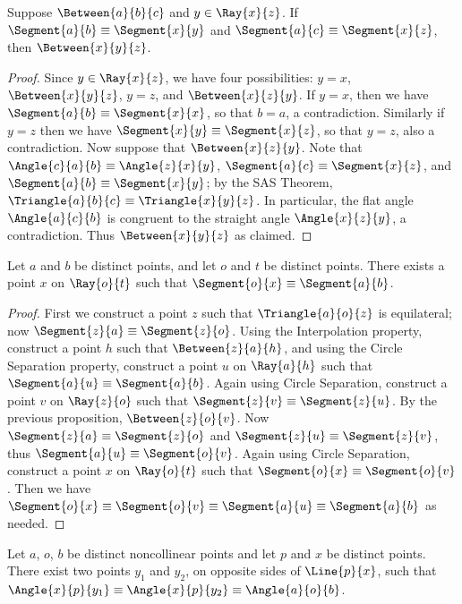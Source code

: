 \documentclass{article}
\begin{document}
\begin{lem}
Suppose $\Between{a}{b}{c}$ and $y \in \Ray{x}{z}$. If $\Segment{a}{b} \equiv \Segment{x}{y}$ and $\Segment{a}{c} \equiv \Segment{x}{z}$, then $\Between{x}{y}{z}$.
\end{lem}

\begin{proof}
Since $y \in \Ray{x}{z}$, we have four possibilities: $y = x$, $\Between{x}{y}{z}$, $y = z$, and $\Between{x}{z}{y}$. If $y = x$, then we have $\Segment{a}{b} \equiv \Segment{x}{x}$, so that $b = a$, a contradiction. Similarly if $y = z$ then we have $\Segment{x}{y} \equiv \Segment{x}{z}$, so that $y = z$, also a contradiction. Now suppose that $\Between{x}{z}{y}$. Note that $\Angle{c}{a}{b} \equiv \Angle{z}{x}{y}$, $\Segment{a}{c} \equiv \Segment{x}{z}$, and $\Segment{a}{b} \equiv \Segment{x}{y}$; by the SAS Theorem, $\Triangle{a}{b}{c} \equiv \Triangle{x}{y}{z}$. In particular, the flat angle $\Angle{a}{c}{b}$ is congruent to the straight angle $\Angle{x}{z}{y}$, a contradiction. Thus $\Between{x}{y}{z}$ as claimed.
\end{proof}

\begin{construct}
Let $a$ and $b$ be distinct points, and let $o$ and $t$ be distinct points. There exists a point $x$ on $\Ray{o}{t}$ such that $\Segment{o}{x} \equiv \Segment{a}{b}$.
\end{construct}

\begin{proof}
First we construct a point $z$ such that $\Triangle{a}{o}{z}$ is equilateral; now $\Segment{z}{a} \equiv \Segment{z}{o}$. Using the Interpolation property, construct a point $h$ such that $\Between{z}{a}{h}$, and using the Circle Separation property, construct a point $u$ on $\Ray{a}{h}$ such that $\Segment{a}{u} \equiv \Segment{a}{b}$. Again using Circle Separation, construct a point $v$ on $\Ray{z}{o}$ such that $\Segment{z}{v} \equiv \Segment{z}{u}$. By the previous proposition, $\Between{z}{o}{v}$. Now $\Segment{z}{a} \equiv \Segment{z}{o}$ and $\Segment{z}{u} \equiv \Segment{z}{v}$, thus $\Segment{a}{u} \equiv \Segment{o}{v}$. Again using Circle Separation, construct a point $x$ on $\Ray{o}{t}$ such that $\Segment{o}{x} \equiv \Segment{o}{v}$. Then we have $\Segment{o}{x} \equiv \Segment{o}{v} \equiv \Segment{a}{u} \equiv \Segment{a}{b}$ as needed.
\end{proof}

\begin{construct}
Let $a$, $o$, $b$ be distinct noncollinear points and let $p$ and $x$ be distinct points. There exist two points $y_1$ and $y_2$, on opposite sides of $\Line{p}{x}$, such that $\Angle{x}{p}{y_1} \equiv \Angle{x}{p}{y_2} \equiv \Angle{a}{o}{b}$. 
\end{construct}
\end{document}
